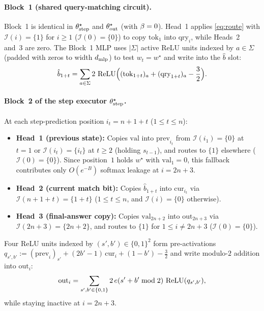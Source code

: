 \paragraph{Block~1 (shared query-matching circuit).}
Block~1 is identical in $\theta^\star_{\mathrm{step}}$ and $\theta^\star_{\mathrm{out}}$ (with $\beta = 0$). Head~1 applies \cref{eq:route} with $\mathcal I(i) = \{1\}$ for $i \ge 1$ ($\mathcal I(0) = \{0\}$) to copy $\mathrm{tok}_1$ into $\mathrm{qry}_i$, while Heads~2 and~3 are zero. The Block~1 MLP uses $|\Sigma|$ active ReLU units indexed by $a \in \Sigma$ (padded with zeros to width $d_{\mathrm{mlp}}$) to test $w_t = w^\star$ and write into the $\hat b$ slot:
\begin{equation}
 \hat b_{1+t} = \sum_{a\in\Sigma} 2\,\relu\Bigl((\mathrm{tok}_{1+t})_a + (\mathrm{qry}_{1+t})_a - \tfrac{3}{2}\Bigr).
 \label{eq:block1-mlp}
\end{equation}

\paragraph{Block~2 of the step executor $\theta^\star_{\mathrm{step}}$.}
At each step-prediction position $i_t = n+1+t$ ($1 \le t \le n$):
\begin{itemize}[leftmargin=*]
\item \textbf{Head~1 (previous state):} Copies $\mathrm{val}$ into $\mathrm{prev}_{i_t}$ from $\mathcal I(i_1) = \{0\}$ at $t = 1$ or $\mathcal I(i_t) = \{i_t\}$ at $t \ge 2$ (holding $s_{t-1}$), and routes to $\{1\}$ elsewhere ($\mathcal I(0) = \{0\}$). Since position~$1$ holds $w^\star$ with $\mathrm{val}_1 = 0$, this fallback contributes only $O(e^{-B})$ softmax leakage at $i = 2n+3$.
\item \textbf{Head~2 (current match bit):} Copies $\hat b_{1+t}$ into $\mathrm{cur}_{i_t}$ via $\mathcal I(n+1+t) = \{1+t\}$ ($1 \le t \le n$, and $\mathcal I(i) = \{0\}$ otherwise).
\item \textbf{Head~3 (final-answer copy):} Copies $\mathrm{val}_{2n+2}$ into $\mathrm{out}_{2n+3}$ via $\mathcal I(2n+3) = \{2n+2\}$, and routes to $\{1\}$ for $1 \le i \ne 2n+3$ ($\mathcal I(0) = \{0\}$).
\end{itemize}
Four ReLU units indexed by $(s', b') \in \{0,1\}^2$ form pre-activations $q_{s',b'} := (\mathrm{prev}_i)_{s'} + (2b' - 1)\,\mathrm{cur}_i + (1 - b') - \tfrac{3}{2}$ and write modulo-$2$ addition into $\mathrm{out}_i$:
\begin{equation}
 \mathrm{out}_i = \sum_{s',b'\in\{0,1\}} 2\,e(s'+b'\bmod 2)\,\operatorname{ReLU}(q_{s',b'}),
 \label{eq:lookup}
\end{equation}
while staying inactive at $i = 2n+3$.

